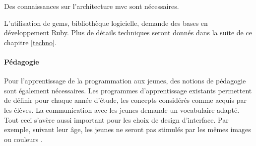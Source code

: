 Des connaissances sur l'architecture \gls{mvc} sont nécessaires.

L'utilisation de \glspl{gem}, bibliothèque logicielle, demande des bases en développement Ruby. Plus de détails techniques seront donnés dans la suite de ce chapitre \ref{techno}. %

\paragraph{Pédagogie}
Pour l'apprentissage de la programmation aux jeunes, des notions de pédagogie sont également nécessaires.
Les programmes d'apprentissage existants permettent de définir pour chaque année d'étude, les concepts considérés comme acquis par les élèves. La communication avec les jeunes demande un vocabulaire adapté. Tout ceci s'avère aussi important pour les choix de design d'interface. Par exemple, suivant leur âge, les jeunes ne seront pas stimulés par les mêmes images ou couleurs \cite{color}. %


